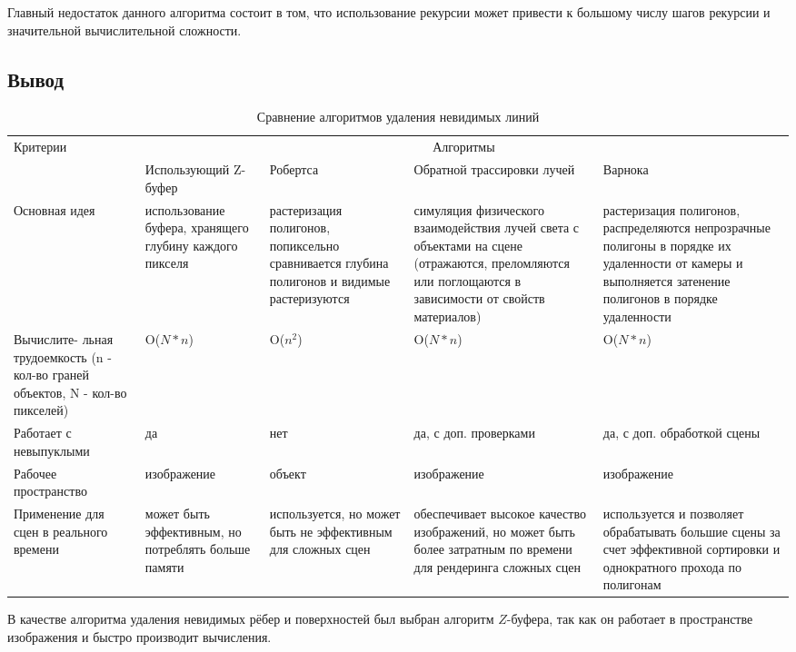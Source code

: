 Главный недостаток данного алгоритма состоит в том, что использование рекурсии может привести к большому числу шагов рекурсии и значительной вычислительной сложности.


\subsection{Вывод}

\begin{table} [] 
	\caption{Сравнение алгоритмов удаления невидимых линий}
	\label{tbl:alg_del}
	\begin{tabular}{|p{}|p{}|p{}|p{}|p{}|}
		\hline
		\multirow{2}{*}{Критерии} & \multicolumn{4}{|c|}{Алгоритмы} \\
		\cline{2-5}
		& Использующий Z-буфер & Робертса & Обратной трассировки лучей & Варнока  \\
		\hline
		Основная идея & использование буфера, хранящего глубину каждого пикселя & растеризация полигонов, попиксельно сравнивается глубина полигонов и видимые растеризуются & симуляция физического взаимодействия лучей света с объектами на сцене (отражаются, преломляются или поглощаются в зависимости от свойств материалов) & растеризация полигонов, распределяются непрозрачные полигоны в порядке их удаленности от камеры и выполняется затенение полигонов в порядке удаленности \\
		\hline
		Вычислите-
		льная трудоемкость (n - кол-во граней объектов, N - кол-во пикселей)& O($N*n$) & O($n^2$) &  O($N*n$) & O($N*n$) \\		
		\hline
		Работает с невыпуклыми & да & нет & да, с доп. проверками & да, с доп. обработкой сцены\\
		\hline
		Рабочее пространство & изображение & объект & изображение & изображение \\ 
		\hline 
		Применение для сцен в реального времени & может быть эффективным, но потреблять больше памяти & используется, но может быть не эффективным для сложных сцен & обеспечивает высокое качество изображений, но может быть более затратным по времени для рендеринга сложных сцен & используется и позволяет обрабатывать большие сцены за счет эффективной сортировки и однократного прохода по полигонам \\
		\hline
	\end{tabular}
\end{table}


В качестве алгоритма удаления невидимых рёбер и поверхностей был выбран алгоритм $Z$-буфера, так как он работает в пространстве изображения и быстро производит вычисления.

